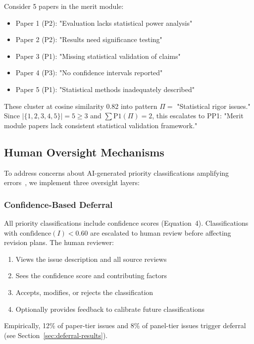 Consider 5 papers in the merit module:
\begin{itemize}
\item Paper 1 (P2): "Evaluation lacks statistical power analysis"
\item Paper 2 (P2): "Results need significance testing"
\item Paper 3 (P1): "Missing statistical validation of claims"
\item Paper 4 (P3): "No confidence intervals reported"
\item Paper 5 (P1): "Statistical methods inadequately described"
\end{itemize}

These cluster at cosine similarity 0.82 into pattern $\Pi = $ "Statistical rigor issues." Since $|\{1,2,3,4,5\}| = 5 \geq 3$ and $\sum \text{P1}(\Pi) = 2$, this escalates to PP1: "Merit module papers lack consistent statistical validation framework."

\subsection{Human Oversight Mechanisms}
\label{sec:oversight}

To address concerns about AI-generated priority classifications amplifying errors~\cite{shneiderman2022human}, we implement three oversight layers:

\subsubsection{Confidence-Based Deferral}

All priority classifications include confidence scores (Equation~4). Classifications with $\text{confidence}(I) < 0.60$ are escalated to human review before affecting revision plans. The human reviewer:
\begin{enumerate}
\item Views the issue description and all source reviews
\item Sees the confidence score and contributing factors
\item Accepts, modifies, or rejects the classification
\item Optionally provides feedback to calibrate future classifications
\end{enumerate}

Empirically, 12\% of paper-tier issues and 8\% of panel-tier issues trigger deferral (see Section~\ref{sec:deferral-results}).

